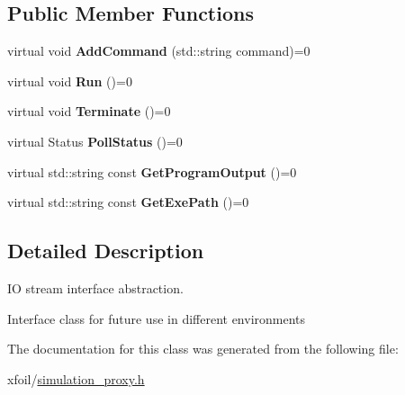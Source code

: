 \subsection*{Public Member Functions}
\begin{DoxyCompactItemize}
\item 
\hypertarget{class_simulation_proxy_a996ae680b35f1cb0729edc2d85044f93}{}\label{class_simulation_proxy_a996ae680b35f1cb0729edc2d85044f93} 
virtual void {\bfseries Add\+Command} (std\+::string command)=0
\item 
\hypertarget{class_simulation_proxy_a142484662b8eb0dbccfb5c3c7a55b029}{}\label{class_simulation_proxy_a142484662b8eb0dbccfb5c3c7a55b029} 
virtual void {\bfseries Run} ()=0
\item 
\hypertarget{class_simulation_proxy_a1cff9c1db93db2018c827edeecf04430}{}\label{class_simulation_proxy_a1cff9c1db93db2018c827edeecf04430} 
virtual void {\bfseries Terminate} ()=0
\item 
\hypertarget{class_simulation_proxy_a863545371c5e5cbae054e1e55ca64c40}{}\label{class_simulation_proxy_a863545371c5e5cbae054e1e55ca64c40} 
virtual Status {\bfseries Poll\+Status} ()=0
\item 
\hypertarget{class_simulation_proxy_a37831053891d434ac166d29dfcaf8dfe}{}\label{class_simulation_proxy_a37831053891d434ac166d29dfcaf8dfe} 
virtual std\+::string const {\bfseries Get\+Program\+Output} ()=0
\item 
\hypertarget{class_simulation_proxy_a6180f5c6be39903828bd1e89de21ea0c}{}\label{class_simulation_proxy_a6180f5c6be39903828bd1e89de21ea0c} 
virtual std\+::string const {\bfseries Get\+Exe\+Path} ()=0
\end{DoxyCompactItemize}


\subsection{Detailed Description}
IO stream interface abstraction. 

Interface class for future use in different environments 

The documentation for this class was generated from the following file\+:\begin{DoxyCompactItemize}
\item 
xfoil/\hyperlink{simulation__proxy_8h}{simulation\+\_\+proxy.\+h}\end{DoxyCompactItemize}
